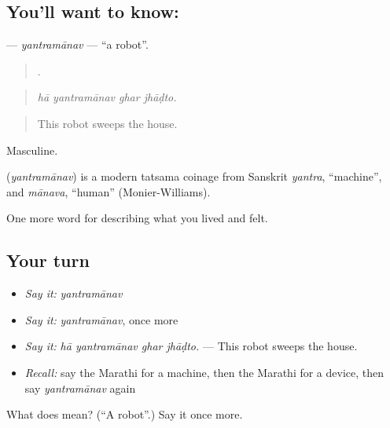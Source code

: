 \subsection*{You'll want to know: }
\textbf{} — \emph{yantramānav} — \textquotedblleft{}a robot\textquotedblright{}.

\begin{quote}
   .
\end{quote}

\begin{quote}
\emph{hā yantramānav ghar jhāḍto.}
\end{quote}

\begin{quote}
This robot sweeps the house.
\end{quote}

Masculine.

\begin{cousinweb}
\textbf{} (\emph{yantramānav}) is a modern tatsama coinage from Sanskrit \emph{yantra}, \textquotedblleft{}machine\textquotedblright{}, and \emph{mānava}, \textquotedblleft{}human\textquotedblright{} (Monier-Williams).
\end{cousinweb}

\begin{grammarlens}[title={What you've built}]
One more word for describing what you lived and felt.
\end{grammarlens}

\subsection*{Your turn}
\begin{itemize}
\raggedright
  \item \emph{Say it:} \emph{yantramānav}
  \item \emph{Say it:} \emph{yantramānav}, once more
  \item \emph{Say it:} \emph{hā yantramānav ghar jhāḍto.} — This robot sweeps the house.
  \item \emph{Recall:} say the Marathi for a machine, then the Marathi for a device, then say \emph{yantramānav} again
\end{itemize}

\begin{tcolorbox}[breakable,colback=teal!4,colframe=teal!35!black,title={Before you move on}]
What does  mean? (\textquotedblleft{}A robot\textquotedblright{}.) Say it once more.
\end{tcolorbox}
